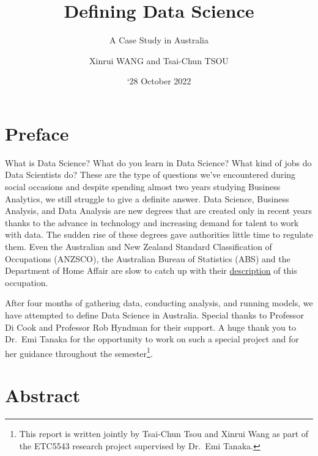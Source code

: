 \documentclass[
  letterpaper,
  DIV=11,
  numbers=noendperiod]{scrreport}
\title{Defining Data Science}
\subtitle{A Case Study in Australia}
\author{Xinrui WANG and Tsai-Chun TSOU}
\date{`28 October 2022}
\renewcommand*\contentsname{Table of contents}
\newcommand\contentsname{Table of contents}
\begin{document}
\maketitle
\ifdefined\Shaded\renewenvironment{Shaded}{\begin{tcolorbox}[enhanced, borderline west={3pt}{0pt}{shadecolor}, frame hidden, boxrule=0pt, interior hidden, breakable, sharp corners]}{\end{tcolorbox}}\fi

\renewcommand*\contentsname{Table of contents}
{
\hypersetup{linkcolor=}
\setcounter{tocdepth}{2}
\tableofcontents
}

\hypertarget{preface}{%
\chapter*{Preface}\label{preface}}

What is Data Science? What do you learn in Data Science? What kind of
jobs do Data Scientists do? These are the type of questions we've
encountered during social occasions and despite spending almost two
years studying Business Analytics, we still struggle to give a definite
answer. Data Science, Business Analysis, and Data Analysis are new
degrees that are created only in recent years thanks to the advance in
technology and increasing demand for talent to work with data. The
sudden rise of these degrees gave authorities little time to regulate
them. Even the Australian and New Zealand Standard Classification of
Occupations (ANZSCO), the Australian Bureau of Statistics (ABS) and the
Department of Home Affair are slow to catch up with their
\href{https://www.hannantew.com.au/blogs/australian-visas/employer-sponsored/tss/the-classification-challenge-in-immigration-what-is-a-data-scientist-as-defined-in-anzsco/}{description}
of this occupation.

After four months of gathering data, conducting analysis, and running
models, we have attempted to define Data Science in Australia. Special
thanks to Professor Di Cook and Professor Rob Hyndman for their support.
A huge thank you to Dr.~Emi Tanaka for the opportunity to work on such a
special project and for her guidance throughout the semester\footnote{This
  report is written jointly by Tsai-Chun Tsou and Xinrui Wang as part of
  the ETC5543 research project supervised by Dr.~Emi Tanaka.}.


\hypertarget{abstract}{%
\chapter{Abstract}\label{abstract}}
\end{document}
